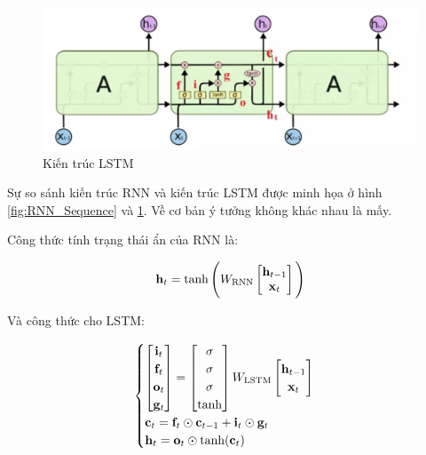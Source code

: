 \documentclass[14pt, a4paper]{article}
\numberwithin{equation}{section}
\numberwithin{algorithm}{section}
\numberwithin{figure}{section}
\numberwithin{table}{section}
\numberwithin{dl}{section}
\numberwithin{md}{section}
\numberwithin{bd}{section}
\numberwithin{dn}{section}
\numberwithin{hq}{section}
\begin{document}
    \begin{figure}[h!] \centering

        \includegraphics[scale=0.8]{LSTM_Sequence.jpg}
        \caption{Kiến trúc LSTM}
    
        \label{fig:LSTM_Sequence}
    \end{figure}

    Sự so sánh kiến trúc RNN và kiến trúc LSTM được minh họa ở hình \ref{fig:RNN_Sequence} và \ref{fig:LSTM_Sequence}.
    Về cơ bản ý tưởng không khác nhau là mấy.

    Công thức tính trạng thái ẩn của RNN là:

    \begin{equation}
        \bold{h}_t = \tanh \Bigg( W_{\mathrm{RNN}} \begin{bmatrix} \bold{h}_{t-1} \\ \bold{x}_t \end{bmatrix} \Bigg)
    \end{equation}

    Và công thức cho LSTM:

    \begin{equation}
        \begin{cases}
            \begin{bmatrix}
                \bold{i}_t \\
                \bold{f}_t \\
                \bold{o}_t \\
                \bold{g}_t
            \end{bmatrix}=\begin{bmatrix}
                \sigma \\
                \sigma \\
                \sigma \\
                \mathrm{tanh}
            \end{bmatrix}W_{\mathrm{LSTM}}\begin{bmatrix}
                \bold{h}_{t-1} \\
                \bold{x}_t
            \end{bmatrix} \\
            \bold{c}_t = \bold{f}_t \odot\bold{c}_{t-1} + \bold{i}_t \odot \bold{g}_t \\
            \bold{h}_t = \bold{o}_t \odot \mathrm{tanh}(\bold{c}_t)
        \end{cases}
    \end{equation}
\end{document}
